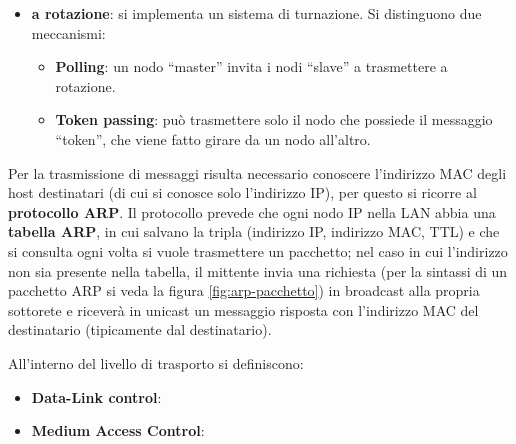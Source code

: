 \documentclass[11pt, italian, openany]{book}
\begin{document}
\begin{sloppypar}
\begin{itemize}[itemsep=0pt,topsep=0pt,parsep=0pt]
\begin{itemize}
		consentita; gli svantaggi le collisioni, lo spreco di slot e il fatto che - in media - un canale trasmetta con successo il 37\% del tempo se
		molti nodi sono attivi contemporaneamente.
		\item \textbf{Unslotted ALOHA}: non si sincronizzano i nodi sugli slot, ogni nodo trasmette non appena ha dati da inviare.
		\item \textbf{Carrier Sense Multiple Access}: si trasmette solo se il canale \`e libero, si attene altrimenti. Le collisioni possono ancora avvenire,
		si introducono meccanismi di \textbf{collision detection} e si interrompe la trasmissione non appena se ne rilevano.
	\end{itemize}
	Si veda inoltre la figura \ref{fig:link-accesso-casuale}.
	\item \textbf{a rotazione}: si implementa un sistema di turnazione. Si distinguono due meccanismi:
	\begin{itemize}
		\item \textbf{Polling}: un nodo ``master'' invita i nodi ``slave'' a trasmettere a rotazione.
		\item \textbf{Token passing}: pu\`o trasmettere solo il nodo che possiede il messaggio ``token'', che viene fatto girare da un nodo all'altro.
	\end{itemize}
\end{itemize}

Per la trasmissione di messaggi risulta necessario conoscere l'indirizzo MAC degli host destinatari (di cui si conosce solo l'indirizzo IP), per questo si
ricorre al \textbf{protocollo ARP}. Il protocollo prevede che ogni nodo IP nella LAN abbia una \textbf{tabella ARP}, in cui salvano la tripla (indirizzo IP,
indirizzo MAC, TTL) e che si consulta ogni volta si vuole trasmettere un pacchetto; nel caso in cui l'indirizzo non sia presente nella tabella, il mittente
invia una richiesta (per la sintassi di un pacchetto ARP si veda la figura \ref{fig:arp-pacchetto}) in broadcast alla propria sottorete e ricever\`a in
unicast un messaggio risposta con l'indirizzo MAC del destinatario (tipicamente dal destinatario).

All'interno del livello di trasporto si definiscono:
\begin{itemize}[itemsep=0pt,topsep=0pt,parsep=0pt]
	\item \textbf{Data-Link control}:
	\item \textbf{Medium Access Control}:
\end{itemize}

\pagebreak


\end{sloppypar}
\end{document}
